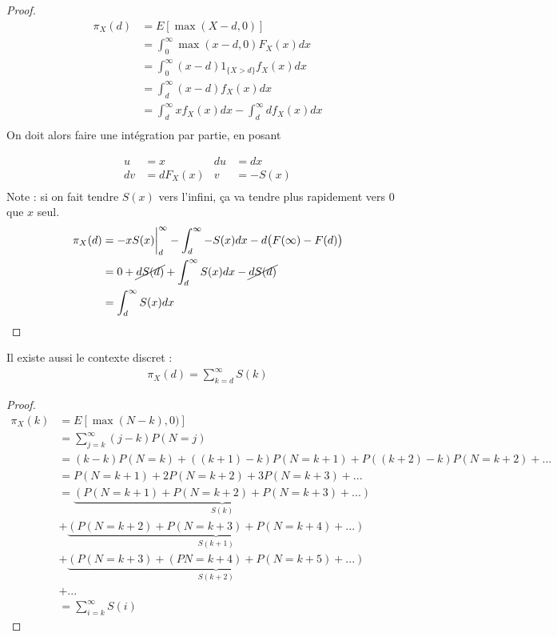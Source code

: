 \begin{proof}
\begin{align*}
\pi_X(d)		& = E[\max(X-d,0)] \\
	& = \int_0^\infty \max(x - d, 0) F_X(x) dx \\
	& = \int_0^\infty (x-d) 1_{\{X > d \}} f_X(x) dx \\
	& = \int_d^\infty (x-d) f_X(x) dx \\
	& = \int_d^\infty x f_X(x) dx - \int_d^\infty d f_X(x) dx \\
\end{align*}
On doit alors faire une intégration par partie, en posant

\begin{displaymath}
\begin{aligned}
u	& = x		& du	 & = dx \\
dv	& = dF_X(x)	& v	 & = -S(x) \\	
\end{aligned}
\end{displaymath}
Note : si on fait tendre $S(x)$ vers l'infini, ça va tendre plus rapidement vers 0 que $x$ seul.
\begin{align*}
\pi_X(d)	& = -xS(x) \biggr \rvert_d^\infty - \int_d^\infty - S(x) dx - d \big(F(\infty) - F(d) \big) \\
	& = 0 + \cancel{dS(d)} + \int_d^\infty S(x) dx - \cancel{dS(d)} \\
	& = \int_d^\infty S(x) dx \\
\end{align*}
\end{proof}
Il existe aussi le contexte discret : 
\begin{align*}
\pi_X(d) = \sum_{k=d}^\infty S(k)
\end{align*}
\begin{proof}
\begin{align*}
\pi_X(k) 	& = E[\max(N-k),0)] \\
	& = \sum_{j=k}^\infty (j-k) P(N = j) \\
	& = (k-k) P(N = k) + ((k+1)-k) P(N = k+1) + P((k+2)-k) P(N = k+2) + ... \\
	& = P(N = k+1) + 2 P(N = k+2) + 3 P(N = k+3) + ... \\
	& = \underbrace{(P(N = k+1) + P(N = k+2) + P(N = k+3) + ...)}_{S(k)} \\
	& + \underbrace{(P(N = k+2) + P(N = k+3) + P(N = k+4) + ...)}_{S(k+1)} \\
	& + \underbrace{(P(N = k+3) + (PN = k+4) + P(N = k+5) + ...)}_{S(k+2)} \\
	& + ... \\
	& = \sum_{i = k}^\infty S(i)
\end{align*}
\end{proof}

